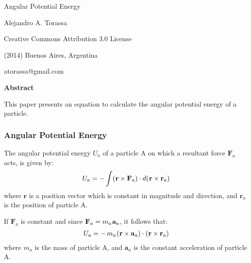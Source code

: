 \documentclass[10pt]{article}
\newcommand{\mM}{m}
\newcommand{\mU}{U}
\newcommand{\ra}{_a}
\newcommand{\vR}{\mathbf{r}}
\newcommand{\vA}{\mathbf{a}}
\newcommand{\vF}{\mathbf{F}}
\begin{document}
\begin{center}

{\LARGE Angular Potential Energy}

\bigskip \medskip

Alejandro A. Torassa

\bigskip \medskip

\footnotesize

Creative Commons Attribution 3.0 License

(2014) Buenos Aires, Argentina

atorassa@gmail.com

\bigskip \smallskip

\small

{\bf Abstract}

\bigskip \smallskip

\parbox{84mm}{This paper presents an equation to calculate the angular potential energy of a particle.}

\end{center}

\normalsize

\vspace{-0.30em}

{\centering\subsubsection*{Angular Potential Energy}}

\vspace{+0.75em}

\par The angular potential energy $\mU\ra$ of a particle A on which a resultant force $\vF\ra$ acts, is given by:
\begin{eqnarray*}
\mU\ra = - \int (\hspace{+0.03em} \vR \times \vF\ra) \cdot d(\hspace{+0.03em} \vR \times \vR\ra)
\end{eqnarray*}
\noindent where $\vR$ is a position vector which is constant in magnitude and direction, and $\vR\ra$ is the position of particle A.
\medskip
\par If $\vF\ra$ is constant and since $\vF\ra = \mM\ra \hspace{+0.09em} \vA\ra$, it follows that:
\begin{eqnarray*}
\mU\ra = - \hspace{+0.18em} \mM\ra \hspace{+0.06em} (\hspace{+0.03em} \vR \times \vA\ra) \cdot (\hspace{+0.03em} \vR \times \vR\ra)
\end{eqnarray*}
\noindent where $\mM\ra$ is the mass of particle A, and $\vA\ra$ is the constant acceleration of particle A.
\end{document}
